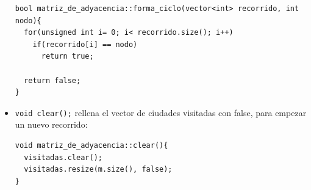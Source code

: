 \documentclass[12pt]{article}
\begin{document}
\begin{itemize}[wide, nosep, labelindent = 0pt, topsep = 1ex]
\begin{lstlisting}
bool matriz_de_adyacencia::forma_ciclo(vector<int> recorrido, int nodo){
  for(unsigned int i= 0; i< recorrido.size(); i++)
    if(recorrido[i] == nodo)
      return true;

  return false;
}
\end{lstlisting}

\item \verb|void clear();| rellena el vector de ciudades visitadas con false, para empezar un nuevo recorrido:
\begin{lstlisting}
void matriz_de_adyacencia::clear(){
  visitadas.clear();
  visitadas.resize(m.size(), false);
}
\end{lstlisting}

\end{itemize}
\end{document}
